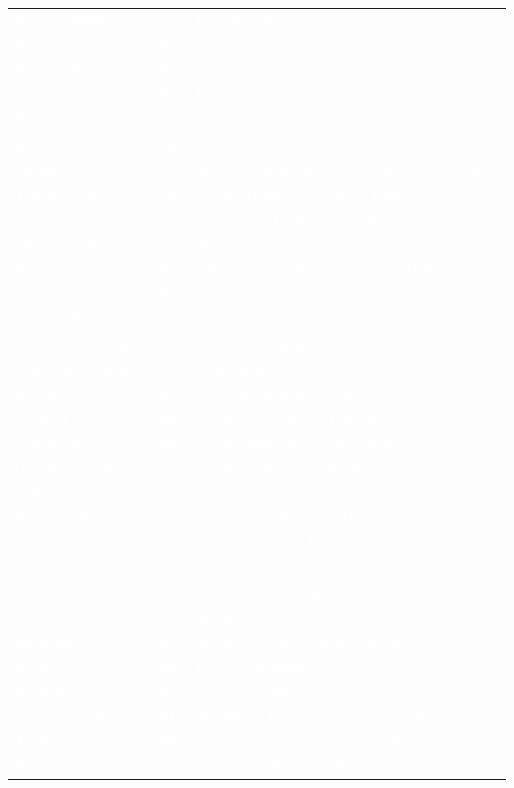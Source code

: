 \documentclass[a5paper, twoside]{article}
\begin{document}
\textcolor{white}{
  \noindent \begin{tabular}{l l l}
    Kabinet AŠSK & 122 & Jadvidžák, Stupka \\
    Rozpočtová účetní & 202 & Polachová \\
    Kabinet ZŘ & 203 & Sítařová \\
    Kancelář & 205 & Jemna \\
    Ředitelna & 206 & Nečas \\
    Server & 210 & Rádl \\
    Chemie & 213 & Brančová, Drdla, Kyasová, Plavčanová, Vašíčková \\
    Tělesná výchova & 218 & Stupka, Doležal, Jandáková, Liškutín,  \\
    & & Marková D., Petrlíková, Štarhová \\
    Mzdová účetní & 219 & Šuléřová \\
    Fyzika 1 & 302 & Přikryl, Glozar, Kučera, Sekerka, Klaška \\
    Fyzika 2 & 303 & Lacinová, Ježek, Řehák \\
    Kabinet ZŘ & 306 & Kobza \\
    Výpočetní technika 2 & 308 & Horáková N., Krejčí T., Ploc \\
    Výpočetní technika 1 & 314 & Blaha, Krejčí P. \\
    Biologie & 402 & Kubištová, Kupčík, Vařejka \\
    Jazyky 1 & 406 & Zvolská, Chovancová, Literáková \\
    Matematika & 409 & Šťastná, Boucník, Juránek, Trnka \\
    Dějepis, zeměpis & 412 & Maříková, Nováková, Hanáková \\
    Čeština & 413 & Marková L., Mrkosová \\
    Kabinet VP & 414 & Žampachová, Nováková M. \\
    Společenské vědy 1 & 415 & Pospíšil, Bučková, Kolcová \\
    Společenské vědy 2 & 417 & Horák, Zerhau \\
    Knihovna & 418 & Pleva, Hudeček, Tillová, Urban, Švancara, Vaněk,  \\
    & & Drášilová \\
    Angličtina 1 & 501 & Smělíková Pilátová, Kallus Brychová \\
    Jazyky 2 & 502 & Jugasová, Sedlinská \\
    Angličtina 2 & 503 & Kubitová, Zubíčková \\
    Výtvarná výchova & 504 & Havlíčková, Hubáček, Nobbs, O'Malley \\
    Jazyky 3 & 509 & Adámková, Clausová, Novotná, Vomelová \\
    Hudební výchova & 515 & Ambrozová, Ptáčková, Řihánková
  \end{tabular}
  }
\end{document}
